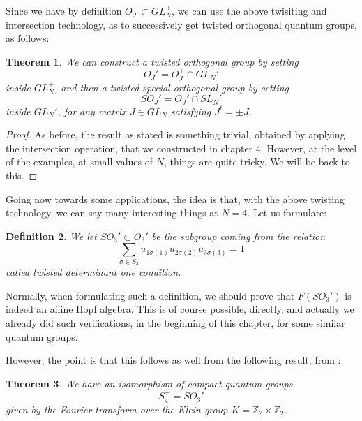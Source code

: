 \documentclass[12pt]{amsbook}
\newtheorem{theorem}{Theorem}[chapter]
\newtheorem{definition}[theorem]{Definition}
\begin{document}
Since we have by definition $O_J^+\subset GL_N^+$, we can use the above twisiting and intersection technology, as to successively get twisted orthogonal quantum groups, as follows:

\begin{theorem}
We can construct a twisted orthogonal group by setting
$$O_J'=O_J^+\cap GL_N'$$
inside $GL_N^+$, and then a twisted special orthogonal group by setting
$$SO_J'=O_J'\cap SL_N'$$
inside $GL_N'$, for any matrix $J\in GL_N$ satisfying $J^t=\pm J$.
\end{theorem}

\begin{proof}
As before, the result as stated is something trivial, obtained by applying the intersection operation, that we constructed in chapter 4. However, at the level of the examples, at small values of $N$, things are quite tricky. We will be back to this. 
\end{proof}

Going now towards some applications, the idea is that, with the above twisting technology, we can say many interesting things at $N=4$. Let us formulate:


\begin{definition}
We let $SO_3'\subset O_3'$ be the subgroup coming from the relation
$$\sum_{\sigma\in S_3}u_{1\sigma(1)}u_{2\sigma(2)}u_{3\sigma(3)}=1$$
called twisted determinant one condition.
\end{definition}

Normally, when formulating such a definition, we should prove that $F(SO_3')$ is indeed an affine Hopf algebra. This is of course possible, directly, and actually we already did such verifications, in the beginning of this chapter, for some similar quantum groups.

\bigskip

However, the point is that this follows as well from the following result, from \cite{bb1}:


\begin{theorem}
We have an isomorphism of compact quantum groups
$$S_4^+=SO_3'$$
given by the Fourier transform over the Klein group $K=\mathbb Z_2\times\mathbb Z_2$.
\end{theorem}
\end{document}
